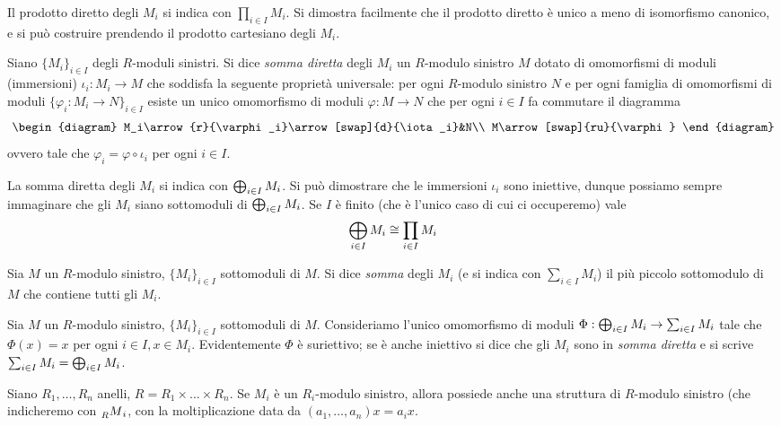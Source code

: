 Il prodotto diretto degli $M_i$ si indica con $\prod_{i\in I}M_i$. Si dimostra facilmente che il prodotto diretto è unico a meno di isomorfismo canonico, e si può costruire prendendo il prodotto cartesiano degli $M_i$.


\begin{definition}
Siano $\{M_i\}_{i\in I}$ degli $R$-moduli sinistri. Si dice \emph{somma diretta} degli $M_i$ un $R$-modulo sinistro $M$ dotato di omomorfismi di moduli (immersioni) $\iota_i:M_i\to M$ che soddisfa la seguente proprietà universale: per ogni $R$-modulo sinistro $N$ e per ogni famiglia di omomorfismi di moduli $\{\varphi_i:M_i\to N\}_{i\in I}$ esiste un unico omomorfismo di moduli $\varphi:M\to N$ che per ogni $i\in I$ fa commutare il diagramma
$$
\begin{diagram}
M_i\arrow{r}{\varphi_i}\arrow[swap]{d}{\iota_i}&N\\
M\arrow[swap]{ru}{\varphi}
\end{diagram}
$$
ovvero tale che $\varphi_i=\varphi\circ\iota_i$ per ogni $i\in I$.
\end{definition}

La somma diretta degli $M_i$ si indica con $\bigoplus_{i\in I}M_i$. Si può dimostrare che le immersioni $\iota_i$ sono iniettive, dunque possiamo sempre immaginare che gli $M_i$ siano sottomoduli di $\bigoplus_{i\in I}M_i$. Se $I$ è finito (che è l'unico caso di cui ci occuperemo) vale
$$
\bigoplus_{i\in I}M_i\cong \prod_{i\in I}M_i
$$


\begin{definition}
Sia $M$ un $R$-modulo sinistro, $\{M_i\}_{i\in I}$ sottomoduli di $M$. Si dice \emph{somma} degli $M_i$ (e si indica con $\sum_{i\in I}M_i$) il più piccolo sottomodulo di $M$ che contiene tutti gli $M_i$.
\end{definition}

\begin{definition}
Sia $M$ un $R$-modulo sinistro, $\{M_i\}_{i\in I}$ sottomoduli di $M$. Consideriamo l'unico omomorfismo di moduli $\Phi:\bigoplus_{i\in I}M_i\to\sum_{i\in I}M_i$ tale che $\Phi(x)=x$ per ogni $i\in I\comma x\in M_i$. Evidentemente $\Phi$ è suriettivo; se è anche iniettivo si dice che gli $M_i$ sono in \emph{somma diretta} e si scrive $\sum_{i\in I}M_i=\bigoplus_{i\in I}M_i$.
\end{definition}


Siano $R_1,\ldots,R_n$ anelli, $R=R_1\times\ldots\times R_n$. Se $M_i$ è un $R_i$-modulo sinistro, allora possiede anche una struttura di $R$-modulo sinistro (che indicheremo con $\prescript{}{R}{M}_i$, con la moltiplicazione data da $(a_1,\ldots,a_n)x=a_ix$.

